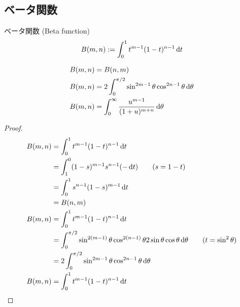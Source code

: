 \documentclass[uplatex,diffipdfmx,a4paper,11pt]{jlreq}
\begin{document}
\subsection{ベータ関数}
\begin{definition}
  ベータ関数 (Beta function)
  \begin{align}
    B(m, n) := \int_{0}^{1}t^{m-1}(1-t)^{n-1}\dl{t}
  \end{align}
\end{definition}

\begin{proposition}
  \begin{align}
    B(m, n) & = B(n, m)                                                          \\
    B(m, n) & = 2\int_0^{\pi/2}\sin^{2m - 1}\theta\cos^{2n - 1}\theta\dl{\theta} \\
    B(m, n) & = \int_0^{\infty}\frac{u^{m-1}}{(1 + u)^{m + n}}\dl{\theta}
  \end{align}
\end{proposition}
\begin{proof}
  \begin{align}
    B(m, n) & = \int_{0}^{1}t^{m-1}(1-t)^{n-1}\dl{t}                                                                             \\
            & = \int_{1}^{0}(1 - s)^{m-1}s^{n-1}(-\dl{t}) \qquad (s = 1 - t)                                                     \\
            & = \int_{0}^{1}s^{n-1}(1 - s)^{m-1}\dl{t}                                                                           \\
            & = B(n, m)                                                                                                          \\
    B(m, n) & = \int_{0}^{1}t^{m-1}(1-t)^{n-1}\dl{t}                                                                             \\
            & = \int_{0}^{\pi/2}\sin^{2(m-1)}\theta\cos^{2(n-1)}\theta2\sin\theta\cos\theta\dl{\theta} \qquad (t = \sin^2\theta) \\
            & = 2\int_0^{\pi/2}\sin^{2m - 1}\theta\cos^{2n - 1}\theta\dl{\theta}                                                 \\
    B(m, n) & = \int_{0}^{1}t^{m-1}(1-t)^{n-1}\dl{t}                                                                             \\
  \end{align}
\end{proof}
\end{document}
